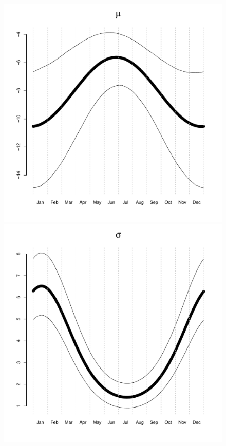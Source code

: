\documentclass[12pt]{article}
\begin{document}
\begin{figure}[H]
\begin{center}
\includegraphics[scale=0.22]{../figs/post_mu.pdf}
\includegraphics[scale=0.22]{../figs/post_sig.pdf}

\end{center}
\end{figure}
\end{document}
